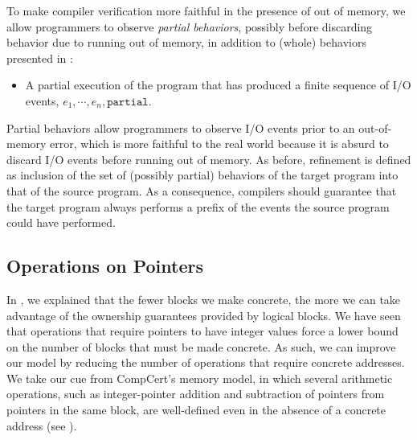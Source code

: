 


To make compiler verification more faithful in the presence of out of memory, we allow programmers
to observe \emph{partial behaviors}, possibly before discarding behavior due to running out of
memory, in addition to (whole) behaviors presented in :
\begin{itemize}
\item A partial execution of the program that has produced a finite sequence
of I/O events, $e_1, \cdots, e_n, \mathtt{partial}$.
\end{itemize}
Partial behaviors allow programmers to observe I/O events prior to an out-of-memory error, which is
more faithful to the real world because it is absurd to discard I/O events before running out of
memory.  As before, refinement is defined as inclusion of the set of (possibly partial) behaviors of
the target program into that of the source program.  As a consequence, compilers should guarantee
that the target program always performs a prefix of the events the source program could have
performed.



\subsection{Operations on Pointers}

In , we explained that the fewer blocks we make concrete, the more we can take advantage of the ownership guarantees provided by logical blocks. We have seen that operations that require pointers to have integer values force a lower bound on the number of blocks that must be made concrete. As such, we can improve our model by reducing the number of operations that require concrete addresses. We take our cue from CompCert's memory model, in which several arithmetic operations, such as integer-pointer addition and subtraction of pointers from pointers in the
same block, are well-defined even in the absence of a concrete address (see ). 


